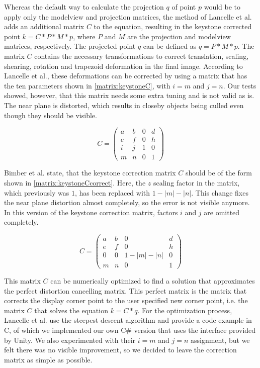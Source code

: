 \documentclass[12pt,a4paper,oneside,pdftex]{report}
\begin{document}
Whereas the default way to calculate the projection $q$ of point $p$ would be to apply only the modelview and projection matrices, the method of Lancelle et al. adds an additional matrix $C$ to the equation, resulting in the keystone corrected point $k = C * P * M * p$, where $P$ and $M$ are the projection and modelview matrices, respectively. The projected point $q$ can be defined as $q = P * M * p$. The matrix $C$ contains the necessary transformations to correct translation, scaling, shearing, rotation and trapezoid deformation in the final image. According to Lancelle et al., these deformations can be corrected by using a matrix that has the ten parameters shown in \eqref{matrix:keystoneC}, with $i = m$ and $j = n$. Our tests showed, however, that this matrix needs some extra tuning and is not valid as is. The near plane is distorted, which results in closeby objects being culled even though they should be visible.

\begin{equation}
\label{matrix:keystoneC}
C = \begin{pmatrix}
  a & b & 0 & d \\[0.3em]
  e & f & 0 & h \\[0.3em]
  i & j & 1 & 0 \\[0.3em]
  m & n & 0 & 1
 \end{pmatrix}
 \end{equation}

Bimber et al. \cite{bimber2005spatial} state, that the keystone correction matrix $C$ should be of the form shown in \eqref{matrix:keystoneCcorrect}. Here, the $z$ scaling factor in the matrix, which previously was $1$, has been replaced with $1 - |m| - |n|$. This change fixes the near plane distortion almost completely, so the error is not visible anymore. In this version of the keystone correction matrix, factors $i$ and $j$ are omitted completely.

\begin{equation}
\label{matrix:keystoneCcorrect}
C = \begin{pmatrix}
  a & b & 0 & d \\[0.3em]
  e & f & 0 & h \\[0.3em]
  0 & 0 & 1 - |m| - |n| & 0 \\[0.3em]
  m & n & 0 & 1
 \end{pmatrix}
 \end{equation}
 
This matrix $C$ can be numerically optimized to find a solution that approximates the perfect distortion cancelling matrix. This perfect matrix is the matrix that corrects the display corner point to the user specified new corner point, i.e. the matrix $C$ that solves the equation $k = C * q$. For the optimization process, Lancelle et al. use the steepest descent algorithm and provide a code example in C, of which we implemented our own C\# version that uses the interface provided by Unity. We also experimented with their $i = m$ and $j = n$ assignment, but we felt there was no visible improvement, so we decided to leave the correction matrix as simple as possible.
\end{document}
